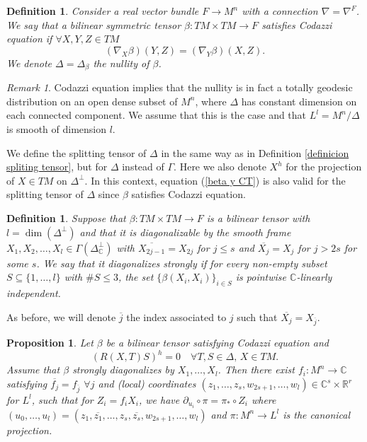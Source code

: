 \documentclass{article}
\newtheorem{prop}[thm]{Proposition}
\newtheorem{defn}[thm]{Definition}
\theoremstyle{remark}
\newtheorem{remark}[thm]{Remark}
\begin{document}
\text{ }


\begin{defn}
\normalfont Consider a real vector bundle $F\rightarrow M^n$ with a connection $\nabla=\nabla^F$. We say that a bilinear symmetric tensor $\beta:TM\times TM\rightarrow F$ {\it satisfies Codazzi equation} if $\forall X,Y,Z\in TM$
\begin{equation}\label{definicion de ser tensor Codazzi}
    (\nabla_X\beta)(Y,Z)=(\nabla_Y\beta)(X,Z).
\end{equation}
We denote $\Delta=\Delta_\beta$ the nullity of $\beta$. 
\end{defn}

\begin{remark}
    Codazzi equation implies that the nullity is in fact a totally geodesic distribution on an open dense subset of $M^n$, where $\Delta$ has constant dimension on each connected component. We assume that this is the case and that $L^l=M^n/\Delta$ is smooth of dimension $l$.
\end{remark}
We define the splitting tensor of $\Delta$ in the same way as in Definition \ref{definicion spliting tensor}, but for $\Delta$ instead of $\Gamma$. Here we also denote $X^h$ for the projection of $X\in TM$ on $\Delta^\perp$. In this context, equation (\ref{beta y CT}) is also valid for the splitting tensor of $\Delta$ since $\beta$ satisfies Codazzi equation.
    
\begin{defn}
    \normalfont Suppose that $\beta:TM\times TM\rightarrow F$ is a bilinear tensor with $l=\dim(\Delta^\perp)$ and that it is diagonalizable by the smooth frame $X_1,X_2,\ldots,X_{l}\in\Gamma(\Delta^\perp_\mathbb{C})$ with $\overline{X_{2j-1}}=X_{2j}$ for $j\leq s$ and $\overline{X_{j}}=X_{j}$ for $j>2s$ for some $s$. We say that it diagonalizes {\it strongly} if for every non-empty subset $S\subseteq\{1,\ldots,l\}$ with $\#S\leq 3$, the set $\{\beta(X_i,X_i)\}_{i\in S}$ is pointwise $\mathbb{C}$-linearly independent. 
\end{defn}
    As before, we will denote $\overline{j}$ the index associated to $j$ such that $\overline{X_j}=X_{\overline{j}}$.
\begin{prop}\label{demostracion Bajar coordenadas} 
    Let $\beta$ be a bilinear tensor satisfying Codazzi equation and
    \begin{equation}\label{R(X,Y)T=0}
        (R(X,T)S)^h=0\quad\forall T,S\in\Delta,\, X\in TM.
    \end{equation}
    Assume that $\beta$ strongly diagonalizes by $X_1,\ldots,X_l$. Then there exist $f_i:M^n\rightarrow\mathbb{C}$ satisfying $\overline{f_{j}}=f_{\overline{j}}$ $\forall j$ and (local) coordinates $(z_1,\ldots,z_s,w_{2s+1},\ldots,w_l)\in\mathbb{C}^s\times\mathbb{R}^r$ for $L^l$, such that for $Z_i=f_i X_i$, we have $\partial_{u_i}\circ\pi =\pi_*\circ Z_i$ 
    where $(u_0,\ldots,u_l)=(z_1,\overline{z_1},\ldots,z_s,\overline{z_s}, w_{2s+1},\ldots, w_l)$ and $\pi:M^n\rightarrow L^l$ is the canonical projection.
\end{prop}
\end{document}
